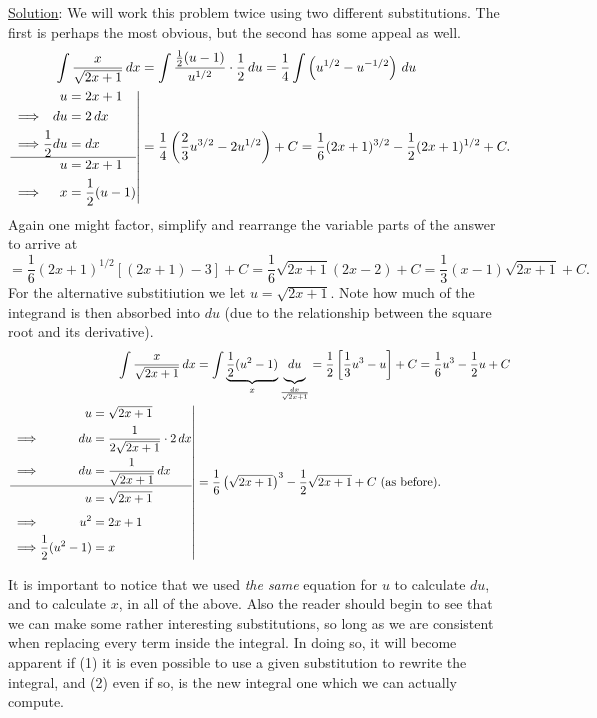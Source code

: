 \underline{Solution}: We will work this problem
twice  using two different
substitutions.  The first is perhaps the most obvious, but the
second has some appeal as well.
\begin{align*}
\int\frac{x}{\sqrt{2x+1}}\,dx&=\int\frac{\frac12(u-1)}{u^{1/2}}\cdot\frac12\,du
=\frac14\int\left(u^{1/2}-u^{-1/2}\right)\,du\\
\left.\begin{alignedat}{2}
&&u&=2x+1\\
&\implies&du&=2\,dx\\
&\implies&\frac12du&=dx\\
\hline
&&u&=2x+1\\
&\implies&x&=\frac12(u-1)
\end{alignedat}\right|&=\frac14\left(\frac23u^{3/2}-2u^{1/2}\right)+C
=\frac16(2x+1)^{3/2}-\frac12(2x+1)^{1/2}+C.
\end{align*}
Again one might factor, simplify and rearrange the variable parts of the answer
to arrive at
$$=\frac16(2x+1)^{1/2}\left[(2x+1)-3\right]+C
  =\frac16\sqrt{2x+1}(2x-2)+C
  =\frac13(x-1)\sqrt{2x+1}+C.$$
For the alternative substitiution we let $u=\sqrt{2x+1}$.  Note how
much of the integrand is then absorbed into $du$ (due to the
relationship between the square root and its derivative).
\begin{align*}
\int\frac{x}{\sqrt{2x+1}}\,dx&=\int\underbrace{\frac12(u^2-1)}_{x}
\underbrace{\,du\,\vphantom{\frac12}}_{\frac{dx}{\sqrt{2x+1}}}
=\frac12\left[\frac13u^3-u\right]+C
=\frac16u^3-\frac12u+C
\\
\left.\begin{alignedat}{2}
&&u&=\sqrt{2x+1}\\
&\implies&du&=\frac1{2\sqrt{2x+1}}\cdot2\,dx\\
&\implies&du&=\frac1{\sqrt{2x+1}}\,dx\\
\hline
&&u&=\sqrt{2x+1}\vphantom{\frac22}\\
&\implies&u^2&=2x+1\\
&\implies&\frac12(u^2-1)&=x\end{alignedat}\right|
&=\frac16\left(\sqrt{2x+1}\right)^3-\frac12\sqrt{2x+1}+C
\text{ (as before).}\end{align*}
\eex


It is important to notice that we used {\it the same} equation
for $u$ to calculate $du$, and to calculate $x$, in all of the above.
Also the reader should begin to see that we can make some rather 
interesting substitutions, so long as we are consistent when
replacing every term inside the integral.  In doing so, it will
become apparent if (1) it is even possible to use a given substitution
to rewrite the integral, and (2) even if so, is the new integral
one which we can actually compute.


